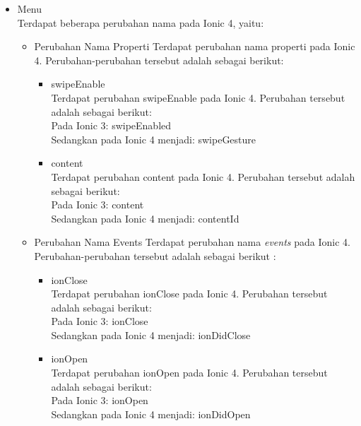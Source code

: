 \begin{enumerate}
\begin{enumerate}
\begin{itemize}
\begin{itemize}
				\item Menu \\
				Terdapat beberapa perubahan nama pada Ionic 4, yaitu:
				\begin{itemize}
					\item Perubahan Nama Properti
					Terdapat perubahan nama properti pada Ionic 4. Perubahan-perubahan tersebut adalah sebagai berikut: 
						\begin{itemize}
							\item swipeEnable \\
							Terdapat perubahan swipeEnable pada Ionic 4. Perubahan tersebut adalah sebagai berikut: \\
							Pada Ionic 3: swipeEnabled \\
							Sedangkan pada Ionic 4 menjadi: swipeGesture						

							\item content \\
							Terdapat perubahan content pada Ionic 4. Perubahan tersebut adalah sebagai berikut: \\
							Pada Ionic 3: content \\
							Sedangkan pada Ionic 4 menjadi: contentId
						\end{itemize}	
					

					\item Perubahan Nama Events
					Terdapat perubahan nama {\it events} pada Ionic 4. Perubahan-perubahan tersebut adalah sebagai berikut :
						\begin{itemize}
							\item ionClose \\
							Terdapat perubahan ionClose pada Ionic 4. Perubahan tersebut adalah sebagai berikut: \\
							Pada Ionic 3: ionClose \\
							Sedangkan pada Ionic 4 menjadi: ionDidClose

							\item ionOpen \\
							Terdapat perubahan ionOpen pada Ionic 4. Perubahan tersebut adalah sebagai berikut: \\
							Pada Ionic 3: ionOpen \\
							Sedangkan pada Ionic 4 menjadi: ionDidOpen
						\end{itemize}	
				\end{itemize}


\end{itemize}
\end{itemize}
\end{enumerate}
\end{enumerate}
